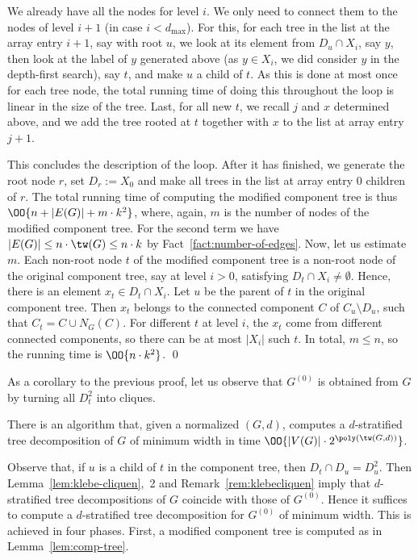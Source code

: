 \documentclass{LMCS}
\begin{document}
We already have all the nodes for level $i$. 
We only need to connect them to the nodes of level $i+1$ 
(in case $i<d_{\max}$). 
For this, for each tree in the list at the array entry $i+1$, 
say with root $u$, 
we look at its element from $D_u\cap X_i$, say $y$, 
then look at the label of $y$ generated above 
(as $y\in X_i$, we did consider $y$ in the depth-first search), 
say $t$, and make $u$ a child of $t$. 
As this is done at most once for each tree node, 
the total running time of doing this throughout the loop 
is linear in the size of the tree. 
Last, for all new $t$, we recall $j$ and $x$ determined above, 
and we add the tree rooted at $t$ together with $x$ 
to the list at array entry $j+1$. 

This concludes the description of the loop. 
After it has finished, we generate the root node $r$, 
set $D_r:=X_0$ and make all trees in the list at array entry $0$ 
children of $r$. 
The total running time of computing the modified component tree 
is thus $\OO{n+|E(G)|+m\cdot k^2}$, 
where, again, $m$ is the number of nodes of the modified component tree. 
For the second term we have $|E(G)|\leq n\cdot\tw(G) \leq n\cdot k$
by Fact~\ref{fact:number-of-edges}. 
Now, let us estimate $m$. 
Each non-root node $t$ of the modified component tree 
is a non-root node of the original component tree, say at level $i>0$, 
satisfying $D_t\cap X_i\not=\emptyset$. 
Hence, there is an element $x_t\in D_t\cap X_i$. 
Let $u$ be the parent of $t$ in the original component tree. 
Then $x_t$ belongs to the connected component $C$ of $C_u\setminus D_u$, 
such that $C_t=C\cup N_G(C)$. 
For different $t$ at level $i$, 
the $x_t$ come from different connected components, 
so there can be at most $|X_i|$ such $t$. 
In total, $m\leq n$, so the running time is $\OO{n\cdot k^2}$. 
\qed

\begin{rem}\label{rem:klebecliquen}
As a corollary to the previous proof, 
let us observe that $G^{(0)}$ is obtained from $G$ 
by turning all $D_t^2$ into cliques. 
\end{rem}

\begin{thm}\label{theo:computing-decompositions}
There is an algorithm that, given a normalized $(G,d)$, 
computes a $d$-stratified tree decomposition of $G$ of minimum width 
in time $\OO{|V(G)|\cdot 2^{\poly(\tw(G,d))}}$. 
\end{thm}

\proof[Proof] 
Observe that, if $u$ is a child of $t$ in the component tree, 
then $D_t\cap D_u=D_u^2$. 
Then Lemma~\ref{lem:klebe-cliquen},~2 and Remark~\ref{rem:klebecliquen} 
imply that $d$-stratified tree decompositions of $G$ 
coincide with those of $G^{(0)}$. 
Hence it suffices to compute a $d$-stratified
tree decomposition for $G^{(0)}$ of minimum width. 
This is achieved in four phases. 
First, a modified component tree is computed as in Lemma~\ref{lem:comp-tree}. 
\end{document}
